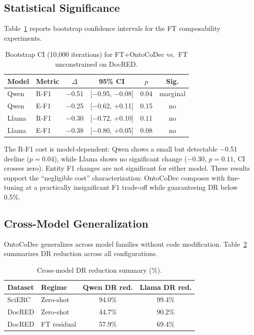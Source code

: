 \documentclass[11pt,a4paper]{article}
\newcommand{\sys}{OntoCoDec}
\newcommand{\pp}{\text{pp}}
\begin{document}
\subsection{Statistical Significance}
\label{sec:bootstrap}

Table~\ref{tab:bootstrap} reports bootstrap confidence intervals for the FT composability experiments.

\begin{table}[t]
\centering
\small
\caption{Bootstrap CI (10,000 iterations) for FT+\sys{} vs.\ FT unconstrained on DocRED.}
\label{tab:bootstrap}
\begin{tabular}{llcccc}
\toprule
\textbf{Model} & \textbf{Metric} & $\Delta$\pp{} & \textbf{95\% CI} & $p$ & \textbf{Sig.} \\
\midrule
Qwen & R-F1 & $-$0.51 & [$-$0.95, $-$0.08] & 0.04 & marginal \\
Qwen & E-F1 & $-$0.25 & [$-$0.62, $+$0.11] & 0.15 & no \\
Llama & R-F1 & $-$0.30 & [$-$0.72, $+$0.10] & 0.11 & no \\
Llama & E-F1 & $-$0.38 & [$-$0.80, $+$0.05] & 0.08 & no \\
\bottomrule
\end{tabular}
\end{table}

The R-F1 cost is model-dependent: Qwen shows a small but detectable $-$0.51\pp{} decline ($p=0.04$), while Llama shows no significant change ($-$0.30\pp{}, $p=0.11$, CI crosses zero).
Entity F1 changes are not significant for either model.
These results support the ``negligible cost'' characterization: \sys{} composes with fine-tuning at a practically insignificant F1 trade-off while guaranteeing DR below 0.5\%.

\subsection{Cross-Model Generalization}

\sys{} generalizes across model families without code modification.
Table~\ref{tab:cross-model-summary} summarizes DR reduction across all configurations.

\begin{table}[t]
\centering
\small
\caption{Cross-model DR reduction summary (\%).}
\label{tab:cross-model-summary}
\begin{tabular}{llcc}
\toprule
\textbf{Dataset} & \textbf{Regime} & \textbf{Qwen DR red.} & \textbf{Llama DR red.} \\
\midrule
SciERC & Zero-shot & 94.0\% & 99.4\% \\
DocRED & Zero-shot & 44.7\% & 90.2\% \\
DocRED & FT residual & 57.9\% & 69.4\% \\
\bottomrule
\end{tabular}
\end{table}
\end{document}
